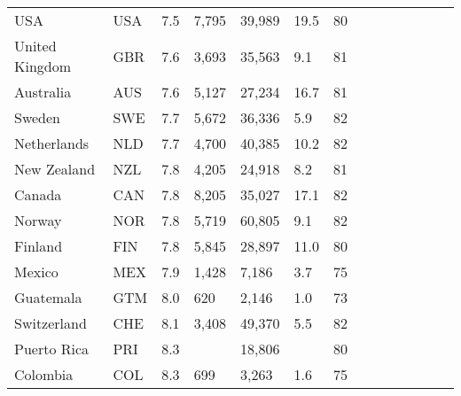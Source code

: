 \begin{scriptsize}
\begin{center}
\begin{longtable}{llllllllllllll}
USA&USA&7.5&7,795&39,989&19.5&80\\
United Kingdom&GBR&7.6&3,693&35,563&9.1&81\\
Australia&AUS&7.6&5,127&27,234&16.7&81\\
Sweden&SWE&7.7&5,672&36,336&5.9&82\\
Netherlands&NLD&7.7&4,700&40,385&10.2&82\\
New Zealand&NZL&7.8&4,205&24,918&8.2&81\\
Canada&CAN&7.8&8,205&35,027&17.1&82\\
Norway&NOR&7.8&5,719&60,805&9.1&82\\
Finland&FIN&7.8&5,845&28,897&11.0&80\\
Mexico&MEX&7.9&1,428&7,186&3.7&75\\
Guatemala&GTM&8.0&620&2,146&1.0&73\\
Switzerland&CHE&8.1&3,408&49,370&5.5&82\\
Puerto Rica&PRI&8.3&&18,806&&80\\
Colombia&COL&8.3&699&3,263&1.6&75\\
\end{longtable} \end{center} \end{scriptsize}   
